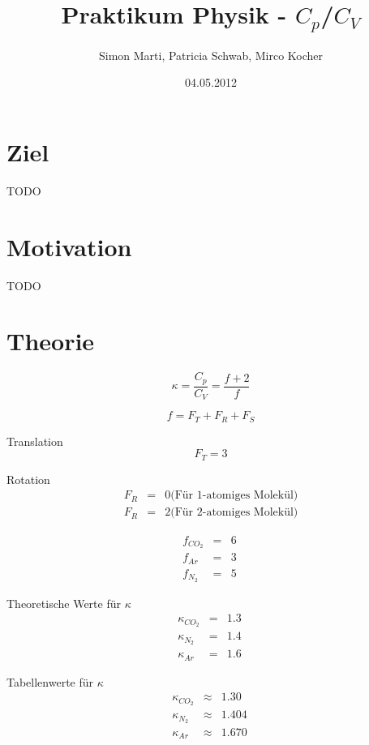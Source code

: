\documentclass[12pt,a4paper]{article}
\title{Praktikum Physik - $C_p$/$C_V$}
\author{Simon Marti, Patricia Schwab, Mirco Kocher}
\date{04.05.2012}
\begin{document}
\maketitle

\section*{Ziel}
TODO


\section*{Motivation}
TODO


\section*{Theorie}
\begin{equation}
\kappa = \frac{C_p}{C_V} = \frac{f+2}{f}
\end{equation}

\begin{equation}
f = F_T + F_R + F_S
\end{equation}

Translation
\begin{equation}
F_T = 3
\end{equation}

Rotation
\begin{eqnarray}
F_R & = & 0 \mbox{(F\"ur 1-atomiges Molek\"ul)} \\
F_R & = & 2 \mbox{(F\"ur 2-atomiges Molek\"ul)}
\end{eqnarray}

\begin{eqnarray}
f_{CO_2} & = & 6 \\
f_{Ar} & = & 3 \\
f_{N_2} & = & 5 \
\end{eqnarray}

Theoretische Werte f\"ur $\kappa $
\begin{eqnarray}
\kappa_{CO_2} & = & 1.3 \\
\kappa_{N_2} & = & 1.4 \\
\kappa_{Ar} & = & 1.6 \
\end{eqnarray}

Tabellenwerte f\"ur $\kappa $
\begin{eqnarray}
\kappa_{CO_2} & \approx & 1.30 \\
\kappa_{N_2} & \approx & 1.404 \\
\kappa_{Ar} & \approx & 1.670 \
\end{eqnarray}
\end{document}
